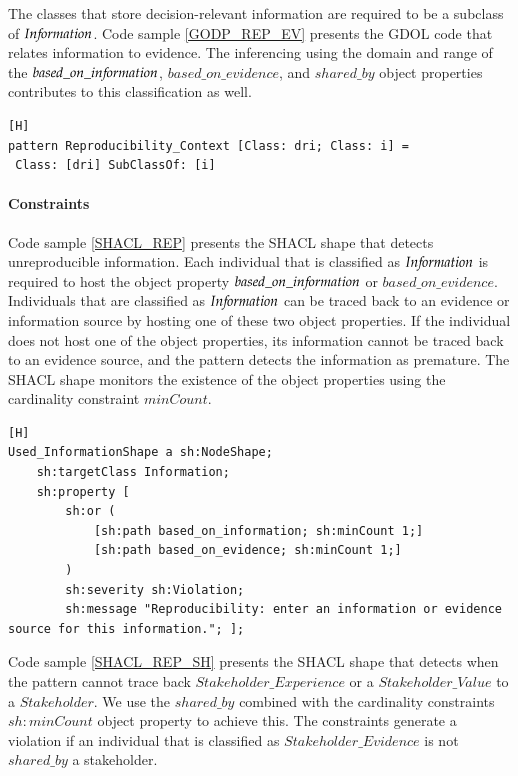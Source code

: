 The classes that store decision-relevant information are required to be a subclass of $In{\mkern-2mu f\mkern-3mu}ormation$. Code sample \ref{GODP_REP_EV} presents the GDOL code that relates information to evidence. The inferencing using the domain and range of the $based\_on\_in{\mkern-2mu f\mkern-3mu}ormation$, $based\_on\_evidence$, and $shared\_by$ object properties contributes to this classification as well.

\begin{lstlisting}[float,language=GDOL,caption={The GDOL code that classifies individuals as a sub-class of $Information$. We use $dri$ (decision relevant information) and $i$ (information) as parameters.},label={GODP_REP_EV}][H]
pattern Reproducibility_Context [Class: dri; Class: i] = 
 Class: [dri] SubClassOf: [i]
\end{lstlisting}

\paragraph{Constraints}
Code sample \ref{SHACL_REP} presents the SHACL shape that detects unreproducible information. Each individual that is classified as $In{\mkern-2mu f\mkern-3mu}ormation$ is required to host the object property $based\_on\_in{\mkern-2mu f\mkern-3mu}ormation$ or $based\_on\_evidence$. Individuals that are classified as $In{\mkern-2mu f\mkern-3mu}ormation$ can be traced back to an evidence or information source by hosting one of these two object properties. If the individual does not host one of the object properties, its information cannot be traced back to an evidence source, and the pattern detects the information as premature. The SHACL shape monitors the existence of the object properties using the cardinality constraint $minCount$. 

\begin{lstlisting}[float,language=SHACL,caption={The SHACL code that detects if $Information$ is not $based\_on\_evidence$ or $based\_on\_in{\f}ormation$. The SHACL shape monitors the existence of these object properties using the cardinality constraint $minCount$. },label={SHACL_REP}][H]
Used_InformationShape a sh:NodeShape;
	sh:targetClass Information; 
	sh:property [
		sh:or (
			[sh:path based_on_information; sh:minCount 1;]
			[sh:path based_on_evidence; sh:minCount 1;]
		)
		sh:severity sh:Violation; 
		sh:message "Reproducibility: enter an information or evidence source for this information."; ];
\end{lstlisting}

Code sample \ref{SHACL_REP_SH} presents the SHACL shape that detects when the pattern cannot trace back $Stakeholder\_Experience$ or a $Stakeholder\_Value$ to a $Stakeholder$. We use the $shared\_by$ combined with the cardinality constraints $sh:minCount$ object property to achieve this. The constraints generate a violation if an individual that is classified as $Stakeholder\_Evidence$ is not $shared\_by$ a stakeholder.

